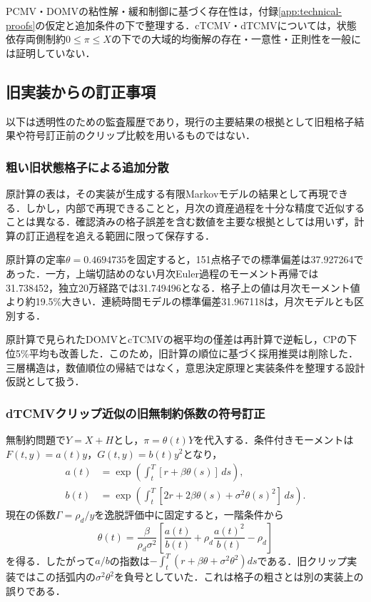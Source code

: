 \documentclass[10pt,a4paper]{article}
\theoremstyle{plain}
\theoremstyle{definition}
\begin{document}
PCMV・DOMVの粘性解・緩和制御に基づく存在性は，付録\ref{app:technical-proofs}の仮定と追加条件の下で整理する．cTCMV・dTCMVについては，状態依存両側制約$0\leq\pi\leq X$の下での大域的均衡解の存在・一意性・正則性を一般には証明していない．

\subsection{旧実装からの訂正事項}\label{app:legacy-corrections}
以下は透明性のための監査履歴であり，現行の主要結果の根拠として旧粗格子結果や符号訂正前のクリップ比較を用いるものではない．

\subsubsection{粗い旧状態格子による追加分散}
原計算の表は，その実装が生成する有限Markovモデルの結果として再現できる．しかし，内部で再現できることと，月次の資産過程を十分な精度で近似することは異なる．確認済みの格子誤差を含む数値を主要な根拠としては用いず，計算の訂正過程を追える範囲に限って保存する．

原計算の定率$\theta=0.4694735$を固定すると，151点格子での標準偏差は37.927264であった．一方，上端切詰めのない月次Euler過程のモーメント再帰では31.738452，独立20万経路では31.749496となる．格子上の値は月次モーメント値より約19.5\%大きい．連続時間モデルの標準偏差31.967118は，月次モデルとも区別する．

原計算で見られたDOMVとcTCMVの裾平均の僅差は再計算で逆転し，CPの下位5\%平均も改善した．このため，旧計算の順位に基づく採用推奨は削除した．三層構造は，数値順位の帰結ではなく，意思決定原理と実装条件を整理する設計仮説として扱う．

\subsubsection{dTCMVクリップ近似の旧無制約係数の符号訂正}
無制約問題で$Y=X+H$とし，$\pi=\theta(t)Y$を代入する．条件付きモーメントは$F(t,y)=a(t)y$，$G(t,y)=b(t)y^2$となり，
\begin{align}
a(t)&=\exp\!\left(\int_t^T[r+\beta\theta(s)]\,ds\right),\\
b(t)&=\exp\!\left(\int_t^T[2r+2\beta\theta(s)+\sigma^2\theta(s)^2]\,ds\right).
\end{align}
現在の係数$\Gamma=\rho_d/y$を逸脱評価中に固定すると，一階条件から
\begin{equation}
\theta(t)=\frac{\beta}{\rho_d\sigma^2}
\left[\frac{a(t)}{b(t)}+\rho_d\frac{a(t)^2}{b(t)}-\rho_d\right]
\end{equation}
を得る．したがって$a/b$の指数は$-\int_t^T(r+\beta\theta+\sigma^2\theta^2)ds$である．旧クリップ実装ではこの括弧内の$\sigma^2\theta^2$を負号としていた．これは格子の粗さとは別の実装上の誤りである．
\end{document}
